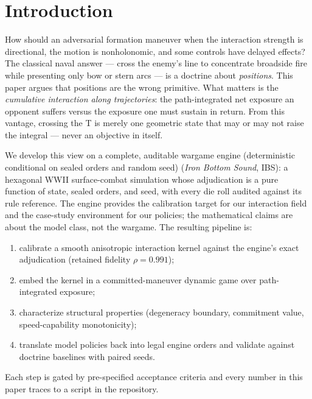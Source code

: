 \documentclass[12pt,a4paper]{article}
\begin{document}
\section{Introduction}\label{sec:intro}

How should an adversarial formation maneuver when the interaction strength
is directional, the motion is nonholonomic, and some controls have delayed
effects?  The classical naval answer --- cross the enemy's line to concentrate
broadside fire while presenting only bow or stern arcs --- is a doctrine about
\emph{positions}.  This paper argues that positions are the wrong primitive.
What matters is the \emph{cumulative interaction along trajectories}: the
path-integrated net exposure an opponent suffers versus the exposure one must
sustain in return.  From this vantage, crossing the T is merely one geometric
state that may or may not raise the integral --- never an objective in itself.

We develop this view on a complete, auditable wargame engine (deterministic conditional on sealed orders and random seed)
(\emph{Iron Bottom Sound}, IBS): a hexagonal WWII surface-combat simulation
whose adjudication is a pure function of state, sealed orders, and seed, with
every die roll audited against its rule reference.  The engine provides the
calibration target for our interaction field and the case-study environment for
our policies; the mathematical claims are about the model class, not the
wargame.  The resulting pipeline is:
\begin{enumerate}
\item calibrate a smooth anisotropic interaction kernel against the engine's
exact adjudication (retained fidelity $\rho=0.991$);
\item embed the kernel in a committed-maneuver dynamic game over
path-integrated exposure;
\item characterize structural properties (degeneracy boundary, commitment
value, speed-capability monotonicity);
\item translate model policies back into legal engine orders and validate
against doctrine baselines with paired seeds.
\end{enumerate}
Each step is gated by pre-specified acceptance criteria and every number in
this paper traces to a script in the repository.
\end{document}

